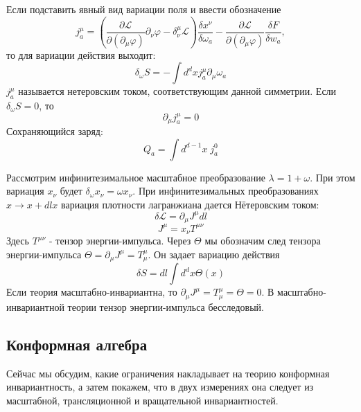 \documentclass[a4paper,12pt]{article}
\theoremstyle{definition}
\theoremstyle{definition}
\theoremstyle{definition}
\begin{document}
Если подставить явный вид вариации поля и ввести обозначение
\begin{equation*}
  j^{\mu}_{a}=\left(\frac{\partial \mathcal{L}}{\partial(\partial_{\mu}\varphi)}\partial_{\nu}\varphi -\delta^{\mu}_{\nu}\mathcal{L}\right) \frac{\delta x^{\nu}}{\delta \omega_{a}}-\frac{\partial \mathcal{L}}{\partial(\partial_{\mu}\varphi)}\frac{\delta F}{\delta w_{a}},
\end{equation*}
то для вариации действия выходит:
\begin{equation*}
  \delta_{\omega}S=-\int d^{d}x j^{\mu}_{a}\partial_{\mu}\omega_{a}
\end{equation*}
$j^{\mu}_{a}$ называется нетеровским током, соответствующим данной симметрии. 
Если $\delta_{\omega} S=0$, то
\begin{equation*}
  \partial_{\mu}j^{\mu}_{a}=0
\end{equation*}
Сохраняющийся заряд:
\begin{equation*}
  Q_{a}=\int d^{d-1}x\; j^{0}_{a}
\end{equation*}

 Рассмотрим инфинитезимальное масштабное преобразование $\lambda=1+\omega$. При этом вариация $x_{\nu}$ будет $\delta_{\omega}x_{\nu}=\omega x_{\nu}$.  При инфинитезимальных преобразованиях $x\to x+dl x$ вариация плотности лагранжиана дается Нётеровским током:
\begin{equation}
  \label{eq:74}
  \delta\mathcal{L}=\partial_{\mu}J^{\mu}dl
\end{equation}
\begin{equation}
  \label{eq:75}
  J^{\mu}=x_{\nu}T^{\mu\nu}
\end{equation}
Здесь $T^{\mu\nu}$ - тензор энергии-импульса.  Через $\Theta$ мы обозначим след тензора энергии-импульса $\Theta=\partial_{\mu}J^{\mu}=T_{\mu}^{\mu}$. Он задает вариацию действия
\begin{equation}
  \label{eq:87}
  \delta S=dl \int d^d x \Theta(x)
\end{equation}
Если теория масштабно-инвариантна, то $\partial_{\mu}J^{\mu}=T_{\mu}^{\mu}=\Theta=0$. В масштабно-инвариантной теории тензор энергии-импульса бесследовый.

\subsection*{Конформная алгебра}
\label{sec:conformal}

 Сейчас мы обсудим, какие ограничения накладывает на теорию конформная инвариантность, а затем покажем, что в двух измерениях она следует из масштабной, трансляционной и вращательной инвариантностей.
\end{document}
